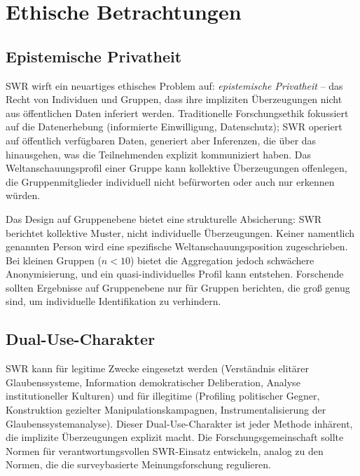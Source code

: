 \documentclass[11pt,a4paper]{article}
\begin{document}
\section{Ethische Betrachtungen}
\label{sec:ethics}

\subsection{Epistemische Privatheit}

SWR wirft ein neuartiges ethisches Problem auf: \emph{epistemische Privatheit} -- das Recht von Individuen und Gruppen, dass ihre impliziten \"Uberzeugungen nicht aus \"offentlichen Daten inferiert werden. Traditionelle Forschungsethik fokussiert auf die Datenerhebung (informierte Einwilligung, Datenschutz); SWR operiert auf \"offentlich verf\"ugbaren Daten, generiert aber Inferenzen, die \"uber das hinausgehen, was die Teilnehmenden explizit kommuniziert haben. Das Weltanschauungsprofil einer Gruppe kann kollektive \"Uberzeugungen offenlegen, die Gruppenmitglieder individuell nicht bef\"urworten oder auch nur erkennen w\"urden.

Das Design auf Gruppenebene bietet eine strukturelle Absicherung: SWR berichtet kollektive Muster, nicht individuelle \"Uberzeugungen. Keiner namentlich genannten Person wird eine spezifische Weltanschauungsposition zugeschrieben. Bei kleinen Gruppen ($n < 10$) bietet die Aggregation jedoch schw\"achere Anonymisierung, und ein quasi-individuelles Profil kann entstehen. Forschende sollten Ergebnisse auf Gruppenebene nur f\"ur Gruppen berichten, die gro\ss{} genug sind, um individuelle Identifikation zu verhindern.

\subsection{Dual-Use-Charakter}

SWR kann f\"ur legitime Zwecke eingesetzt werden (Verst\"andnis elit\"arer Glaubenssysteme, Information demokratischer Deliberation, Analyse institutioneller Kulturen) und f\"ur illegitime (Profiling politischer Gegner, Konstruktion gezielter Manipulationskampagnen, Instrumentalisierung der Glaubenssystemanalyse). Dieser Dual-Use-Charakter ist jeder Methode inh\"arent, die implizite \"Uberzeugungen explizit macht. Die Forschungsgemeinschaft sollte Normen f\"ur verantwortungsvollen SWR-Einsatz entwickeln, analog zu den Normen, die die surveybasierte Meinungsforschung regulieren.
\end{document}
